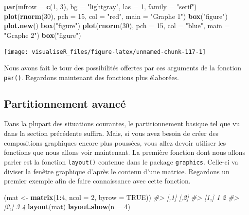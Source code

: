 \documentclass[]{article}
\newenvironment{Shaded}{\begin{snugshade}}{\end{snugshade}}
\newcommand{\CommentTok}[1]{\textcolor[rgb]{0.56,0.35,0.01}{\textit{#1}}}
\newcommand{\DataTypeTok}[1]{\textcolor[rgb]{0.13,0.29,0.53}{#1}}
\newcommand{\DecValTok}[1]{\textcolor[rgb]{0.00,0.00,0.81}{#1}}
\newcommand{\KeywordTok}[1]{\textcolor[rgb]{0.13,0.29,0.53}{\textbf{#1}}}
\newcommand{\NormalTok}[1]{#1}
\newcommand{\OperatorTok}[1]{\textcolor[rgb]{0.81,0.36,0.00}{\textbf{#1}}}
\newcommand{\OtherTok}[1]{\textcolor[rgb]{0.56,0.35,0.01}{#1}}
\newcommand{\StringTok}[1]{\textcolor[rgb]{0.31,0.60,0.02}{#1}}
\begin{document}
\begin{Shaded}
\begin{Highlighting}[]
\KeywordTok{par}\NormalTok{(}\DataTypeTok{mfrow =} \KeywordTok{c}\NormalTok{(}\DecValTok{1}\NormalTok{, }\DecValTok{3}\NormalTok{), }\DataTypeTok{bg =} \StringTok{"lightgray"}\NormalTok{, }\DataTypeTok{las =} \DecValTok{1}\NormalTok{, }\DataTypeTok{family =} \StringTok{"serif"}\NormalTok{)}
\KeywordTok{plot}\NormalTok{(}\KeywordTok{rnorm}\NormalTok{(}\DecValTok{30}\NormalTok{), }\DataTypeTok{pch =} \DecValTok{15}\NormalTok{, }\DataTypeTok{col =} \StringTok{"red"}\NormalTok{, }\DataTypeTok{main =} \StringTok{"Graphe 1"}\NormalTok{)}
\KeywordTok{box}\NormalTok{(}\StringTok{"figure"}\NormalTok{)}
\KeywordTok{plot.new}\NormalTok{()}
\KeywordTok{box}\NormalTok{(}\StringTok{"figure"}\NormalTok{)}
\KeywordTok{plot}\NormalTok{(}\KeywordTok{rnorm}\NormalTok{(}\DecValTok{30}\NormalTok{), }\DataTypeTok{pch =} \DecValTok{15}\NormalTok{, }\DataTypeTok{col =} \StringTok{"blue"}\NormalTok{, }\DataTypeTok{main =} \StringTok{"Graphe 2"}\NormalTok{)}
\KeywordTok{box}\NormalTok{(}\StringTok{"figure"}\NormalTok{)}
\end{Highlighting}
\end{Shaded}

\begin{center}\texttt{[image: visualiseR\_files/figure-latex/unnamed-chunk-117-1]} \end{center}

Nous avons fait le tour des possibilités offertes par ces arguments de la fonction \texttt{par()}. Regardons maintenant des fonctions plus élaborées.

\hypertarget{partitionnement-avancuxe9}{%
\subsection{Partitionnement avancé}\label{partitionnement-avancuxe9}}

Dans la plupart des situations courantes, le partitionnement basique tel que vu
dans la section précédente suffira. Mais, si vous avez besoin de créer des
compositions graphiques encore plus poussées, vous allez devoir utiliser les
fonctions que nous allons voir maintenant. La première fonction dont nous allons
parler est la fonction \texttt{layout()} contenue dans le package \texttt{graphics}. Celle-ci
va diviser la fenêtre graphique d'après le contenu d'une matrice. Regardons un
premier exemple afin de faire connaissance avec cette fonction.

\begin{Shaded}
\begin{Highlighting}[]
\NormalTok{(mat <-}\StringTok{ }\KeywordTok{matrix}\NormalTok{(}\DecValTok{1}\OperatorTok{:}\DecValTok{4}\NormalTok{, }\DataTypeTok{ncol =} \DecValTok{2}\NormalTok{, }\DataTypeTok{byrow =} \OtherTok{TRUE}\NormalTok{))}
\CommentTok{#>      [,1] [,2]}
\CommentTok{#> [1,]    1    2}
\CommentTok{#> [2,]    3    4}
\KeywordTok{layout}\NormalTok{(mat)}
\KeywordTok{layout.show}\NormalTok{(}\DataTypeTok{n =} \DecValTok{4}\NormalTok{)}
\end{Highlighting}
\end{Shaded}
\end{document}
